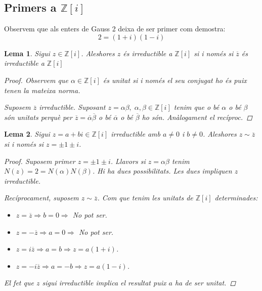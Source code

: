 \documentclass[a4paper,11pt]{report}
\renewcommand{\bar}{\overline}
\newcommand{\im}{\Rightarrow}
\theoremstyle{theorem}
\newtheorem{lema}{\normalfont \sffamily\bfseries Lema}[section]
\theoremstyle{definition}
\begin{document}
\subsection{Primers a $\mathbb{Z}[i]$}
Observem que als enters de Gauss 2 deixa de ser primer com demostra:
$$2=(1+i)(1-i)$$
\begin{lema}
	Sigui $z\in \mathbb{Z}[i]$. Aleshores $z$ és irreductible a $\mathbb{Z}[i]$ si i només si $\bar{z}$ és irreductible a $\mathbb{Z}[i]$
	\begin{proof}
		Observem que $\alpha\in \mathbb{Z}[i]$ és unitat si i només el seu conjugat ho és puix tenen la mateixa norma.
		
		Suposem $\bar{z}$ irreductible. Suposant $z=\alpha\beta,\;\alpha,\beta\in \mathbb{Z}[i]$ tenim que o bé $\alpha$ o bé $\beta $ són unitats perquè per $\bar{z}=\bar{\alpha}\bar{\beta}$ o bé $\bar{\alpha}$ o bé $\bar{\beta}$ ho són. Anàlogament el recíproc.	\end{proof}
\end{lema}
\begin{lema}
	Sigui $z=a+bi\in\mathbb{Z}[i]$ irreductible amb $a\neq 0$ i $b\neq 0$. Aleshores $z\sim \bar{z}$ si i només si $z=\pm 1\pm i$.
	\begin{proof}
		Suposem primer $z=\pm 1 \pm i$. Llavors si $z=\alpha\beta$ tenim $N(z)=2=N(\alpha)N(\beta)$. Hi ha dues possibilitats. Les dues impliquen $z$ irreductible.
		
		Recíprocament, suposem $z\sim\bar{z}$. Com que tenim les unitats de $\mathbb{Z}[i]$ determinades:
		\begin{itemize}
			\item $z=\bar{z}\im b=0\im$ No pot ser.
			\item $z=-\bar{z}\im a=0\im$ No pot ser.
			\item $z=i\bar{z}\im a=b\im z=a(1+i)$.
			\item $z=-i\bar{z}\im a=-b\im z=a(1-i)$.
		\end{itemize}
	El fet que $z$ sigui irreductible implica el resultat puix $a$ ha de ser unitat.
	\end{proof}
\end{lema}
\end{document}

